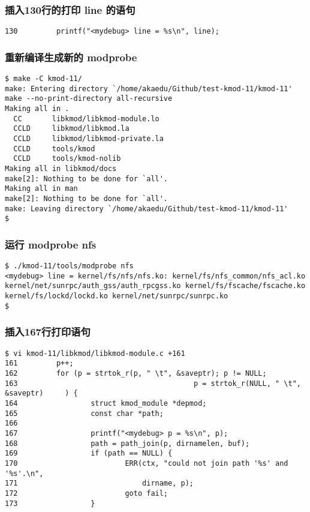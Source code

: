 \documentclass[11pt,a4paper]{article}
\begin{document}
\subsubsection{插入130行的打印 line 的语句}

{\begin{shaded}\begin{verbatim}
130         printf("<mydebug> line = %s\n", line);
\end{verbatim}\end{shaded}}
\subsubsection{重新编译生成新的 modprobe}

{\begin{shaded}\begin{verbatim}
$ make -C kmod-11/
make: Entering directory `/home/akaedu/Github/test-kmod-11/kmod-11'
make --no-print-directory all-recursive
Making all in .
  CC       libkmod/libkmod-module.lo
  CCLD     libkmod/libkmod.la
  CCLD     libkmod/libkmod-private.la
  CCLD     tools/kmod
  CCLD     tools/kmod-nolib
Making all in libkmod/docs
make[2]: Nothing to be done for `all'.
Making all in man
make[2]: Nothing to be done for `all'.
make: Leaving directory `/home/akaedu/Github/test-kmod-11/kmod-11'
$ 
\end{verbatim}\end{shaded}}
\subsubsection{运行 modprobe nfs}

{\begin{shaded}\begin{verbatim}
$ ./kmod-11/tools/modprobe nfs
<mydebug> line = kernel/fs/nfs/nfs.ko: kernel/fs/nfs_common/nfs_acl.ko kernel/net/sunrpc/auth_gss/auth_rpcgss.ko kernel/fs/fscache/fscache.ko kernel/fs/lockd/lockd.ko kernel/net/sunrpc/sunrpc.ko
$ 
\end{verbatim}\end{shaded}}
\subsubsection{插入167行打印语句}

{\begin{shaded}\begin{verbatim}
$ vi kmod-11/libkmod/libkmod-module.c +161
161         p++;
162         for (p = strtok_r(p, " \t", &saveptr); p != NULL;
163                                         p = strtok_r(NULL, " \t", &saveptr)     ) {
164                 struct kmod_module *depmod;
165                 const char *path;
166 
167                 printf("<mydebug> p = %s\n", p);
168                 path = path_join(p, dirnamelen, buf);
169                 if (path == NULL) {
170                         ERR(ctx, "could not join path '%s' and '%s'.\n",
171                             dirname, p);
172                         goto fail;
173                 }
\end{verbatim}\end{shaded}}
\end{document}
